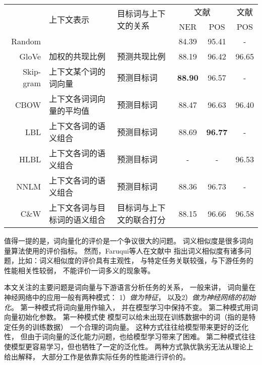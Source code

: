 \begin{table}[t]
\centering
{}
\vspace{0.5em}\centering\wuhao
\begin{tabular}{r | p{4.3cm}p{2.8cm} | cc | c}
	\toprule[1.5pt]
	 & \multirow{2}{*}{上下文表示} &  \multirow{2}{2.5cm}{目标词与上下文的关系} & \multicolumn{2}{c|}{文献\inlinecite{7478417}} & 文献\inlinecite{yin-schutze:2016:P16-1} \\
	 &  &  & NER & POS & POS \\
	\midrule[1pt]
	Random & & & 84.39 & 95.41 & - \\
	\midrule[0.5pt]
	GloVe & 加权的共现比例 & 预测共现比例 & 88.19 & 96.42 & 96.65 \\
	Skip-gram & 上下文某个词的词向量 & 预测目标词& \textbf{88.90} & 96.57 & - \\
	CBOW & 上下文各词词向量的平均值& 预测目标词& 88.47 & 96.63 & 96.40 \\
	LBL & 上下文各词的语义组合& 预测目标词& 88.69 & \textbf{96.77} & - \\
	HLBL& 上下文各词的语义组合& 预测目标词& - & - & 96.53 \\
	NNLM & 上下文各词的语义组合& 预测目标词& 88.36 & 96.73 & - \\
	C\&W & 上下文各词与目标词的语义组合& 目标词与上下文的联合打分& 88.15 & 96.66 & 96.58 \\
	\bottomrule[1.5pt]
\end{tabular}
\end{table}
值得一提的是，词向量化的评价是一个争议很大的问题。
词义相似度是很多词向量算法使用的评价指标。
然而，Faruqui等人在文献中
指出词义相似度有诸多问题，比如：词义相似度的评价具有主观性，
与特定任务关联较强，与下游任务的性能相关性较弱，
不能评价一词多义的现象等。

本文关注的主要问题是词向量与下游语言分析任务的关系，
一般来讲，
词向量在神经网络中的应用一般有两种模式：
1）\textit{做为特征}，
以及2）\textit{做为神经网络的初始化}。
第一种模式将词向量用作输入，
并在模型学习中保持不变。
第二种模式用词向量初始化参数。
第一种模式使
模型可以给未出现在训练数据中的词（指的是特定任务的训练数据）
一个合理的词向量。
这种方式往往给模型带来更好的泛化性，
但由于词向量的泛化能力问题，也给模型学习带来了困难。
第二种模式往往使模型更容易学习，但也牺牲了一定的泛化性。
两种方式孰优孰劣无法从理论上给出解释，
大部分工作是依靠实际任务的性能进行评价的。

